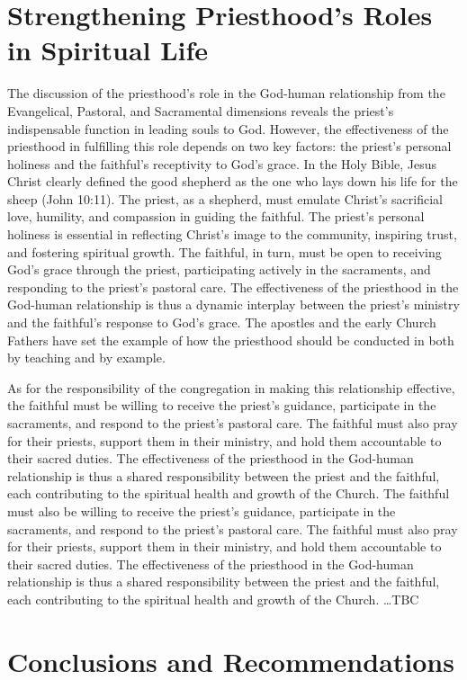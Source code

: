 \documentclass[12pt, doc]{apa7}   	%
\begin{document}
\section{Strengthening Priesthood's Roles in Spiritual Life}
The discussion of the priesthood’s role in the God-human relationship from the Evangelical, Pastoral, and Sacramental dimensions reveals the priest’s indispensable function in leading souls to God. However, the effectiveness of the priesthood in fulfilling this role depends on two key factors: the priest’s personal holiness and the faithful’s receptivity to God’s grace.  In the Holy Bible, Jesus Christ clearly defined the good shepherd as the one who lays down his life for the sheep (John 10:11).  The priest, as a shepherd, must emulate Christ’s sacrificial love, humility, and compassion in guiding the faithful.  The priest’s personal holiness is essential in reflecting Christ’s image to the community, inspiring trust, and fostering spiritual growth.  The faithful, in turn, must be open to receiving God’s grace through the priest, participating actively in the sacraments, and responding to the priest’s pastoral care.  The effectiveness of the priesthood in the God-human relationship is thus a dynamic interplay between the priest’s ministry and the faithful’s response to God’s grace.  The apostles and the early Church Fathers have set the example of how the priesthood should be conducted in both by teaching and by example. 

As for the responsibility of the congregation in making this relationship effective, the faithful must be willing to receive the priest’s guidance, participate in the sacraments, and respond to the priest’s pastoral care.  The faithful must also pray for their priests, support them in their ministry, and hold them accountable to their sacred duties.  The effectiveness of the priesthood in the God-human relationship is thus a shared responsibility between the priest and the faithful, each contributing to the spiritual health and growth of the Church.  The faithful must also be willing to receive the priest’s guidance, participate in the sacraments, and respond to the priest’s pastoral care.  The faithful must also pray for their priests, support them in their ministry, and hold them accountable to their sacred duties.  The effectiveness of the priesthood in the God-human relationship is thus a shared responsibility between the priest and the faithful, each contributing to the spiritual health and growth of the Church. \dots TBC

\section{Conclusions and Recommendations}
\end{document}
